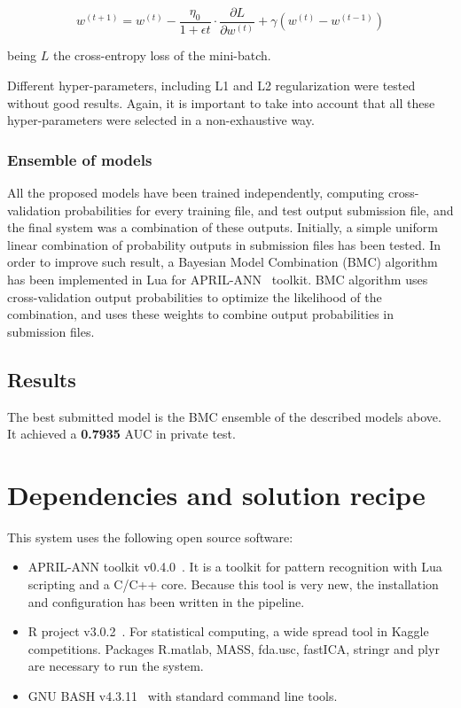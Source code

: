 \documentclass[a4paper,english,twoside]{article}
\begin{document}
\begin{equation}
w^{(t+1)} = w^{(t)} - \frac{\eta_0}{1 + \epsilon t} \cdot \frac{\partial L}{\partial w^{(t)}} + \gamma ( w^{(t)} - w^{(t-1)} )
\end{equation}

\noindent being $L$ the cross-entropy loss of the mini-batch.

Different hyper-parameters, including L1 and L2 regularization were tested without
good results. Again, it is important to take into account that all these
hyper-parameters were selected in a non-exhaustive way.

\subsubsection{Ensemble of models}\label{ensemble-of-models}

All the proposed models have been trained independently, computing
cross-validation probabilities for every training file, and test output
submission file, and the final system was a combination of these outputs.
Initially, a simple uniform linear combination of probability outputs in
submission files has been tested. In order to improve such result, a Bayesian
Model Combination (BMC) algorithm~\cite{2011:monteith:ijcnn} has been
implemented in Lua for APRIL-ANN~\cite{aprilann} toolkit. BMC algorithm uses
cross-validation output probabilities to optimize the likelihood of the
combination, and uses these weights to combine output probabilities in
submission files.

\subsection{Results}\label{results}

The best submitted model is the BMC ensemble of the described models
above. It achieved a \textbf{0.7935} AUC in private test.

\section{Dependencies and solution recipe}\label{dependencies}

This system uses the following open source software:

\begin{itemize}
\item APRIL-ANN toolkit v0.4.0~\cite{aprilann}. It is a toolkit for pattern
  recognition with Lua scripting and a C/C++ core.  Because this tool is very
  new, the installation and configuration has been written in the pipeline.
\item R project v3.0.2~\cite{Rproject}. For statistical
  computing, a wide spread tool in Kaggle competitions. Packages
  R.matlab, MASS, fda.usc, fastICA, stringr and plyr are necessary to
  run the system.
\item GNU BASH v4.3.11~\cite{bash} with standard command line tools.
\end{itemize}
\end{document}
